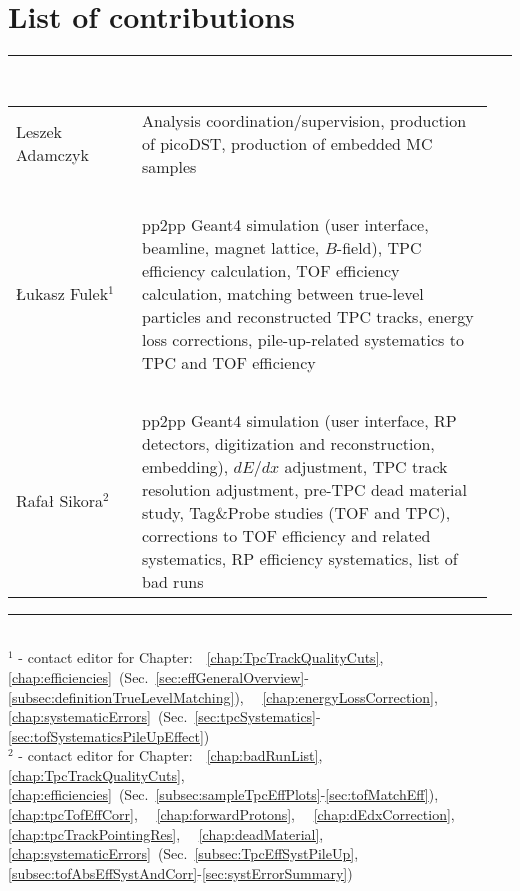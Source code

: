 \section*{\LARGE List of contributions}%
%
   \rule{\textwidth}{1.0pt}\\[5pt]%
      \begin{tabular}{>{\raggedright}p{0.25\linewidth}p{0.7\linewidth}}
		Leszek Adamczyk & Analysis coordination/supervision, production of picoDST, production of embedded MC samples\\
		~&~\\
		Łukasz Fulek$^{1}$  & pp2pp Geant4 simulation (user interface, beamline, magnet lattice, $B$-field), TPC efficiency calculation, TOF efficiency calculation, matching between true-level particles and reconstructed TPC tracks, energy loss corrections, pile-up-related systematics to TPC and TOF efficiency\\
		~&~\\
        Rafał Sikora$^{2}$  & pp2pp Geant4 simulation (user interface, RP detectors, digitization and reconstruction, embedding), $dE/dx$ adjustment, TPC track resolution adjustment, pre-TPC dead material study, Tag\&Probe studies (TOF and TPC), corrections to TOF efficiency and related systematics, RP efficiency systematics, list of bad runs\\
      \end{tabular}\newline
   \rule{\textwidth}{1.0pt}\\[10pt]%
   $^{1}$ - contact editor for Chapter:~~\ref{chap:TpcTrackQualityCuts},~~%
                                        \ref{chap:efficiencies}~(Sec.~\ref{sec:effGeneralOverview}-\ref{subsec:definitionTrueLevelMatching}),~~%
                                        \ref{chap:energyLossCorrection},~~%
                                        \ref{chap:systematicErrors}~(Sec.~\ref{sec:tpcSystematics}-\ref{sec:tofSystematicsPileUpEffect})%
                                        \\[2pt]
   $^{2}$ - contact editor for Chapter:~~\ref{chap:badRunList},~~%
                                        \ref{chap:TpcTrackQualityCuts},~~%
                                        \ref{chap:efficiencies}~(Sec.~\ref{subsec:sampleTpcEffPlots}-\ref{sec:tofMatchEff}),~~%
                                        \ref{chap:tpcTofEffCorr},~~%
                                        \ref{chap:forwardProtons},~~%
                                        \ref{chap:dEdxCorrection},~~%
                                        \ref{chap:tpcTrackPointingRes},~~%
                                        \ref{chap:deadMaterial},~~%
                                        \ref{chap:systematicErrors}~(Sec.~\ref{subsec:TpcEffSystPileUp},\ref{subsec:tofAbsEffSystAndCorr}-\ref{sec:systErrorSummary})%
                                        \\
   \\[50pt]%

